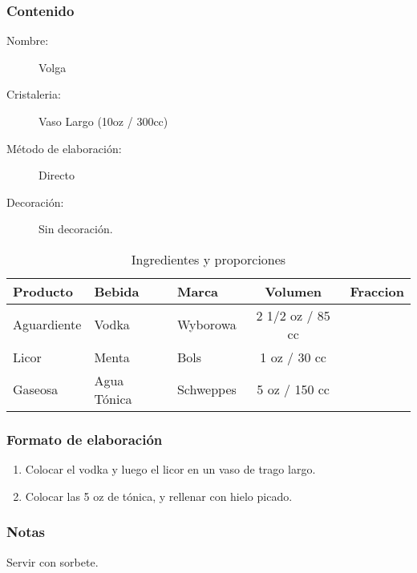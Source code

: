 \bigskip 
\bigskip 
\subsubsection{Contenido}
\bigskip 

\begin{description}
\item[Nombre:] Volga
\item[Cristaleria:] Vaso Largo (10oz / 300cc)
\item[M\'etodo de elaboraci\'on:] Directo
\item[Decoraci\'on:] Sin decoraci\'on.
\end{description}

\begin{table}[h]
\caption{Ingredientes y proporciones} 
\label{tab:fonts}
\begin{center}       
\begin{tabular}{|l|l|l|c|l|} %
\hline
\rule[-1ex]{0pt}{3.5ex}  \textbf{Producto} & \textbf{Bebida} & \textbf{Marca} & \textbf{Volumen} & \textbf{Fraccion}  \\
\hline
\rule[-1ex]{0pt}{3.5ex}  Aguardiente & Vodka 			& Wyborowa 		& 2 1/2 oz / 85 cc 	&  	\\
\hline
\rule[-1ex]{0pt}{3.5ex}  Licor 		& Menta	 	& Bols		& 1 oz / 30 cc 		&  	\\
\hline
\rule[-1ex]{0pt}{3.5ex}  Gaseosa	& Agua T\'onica 	& Schweppes 				& 5 oz / 150 cc		& 	\\
\hline

\end{tabular}
\end{center}
\end{table} 
\bigskip 

\subsubsection{Formato de elaboraci\'on} 
\label{sec:title}
\bigskip 
\begin{center}
\begin{enumerate}
\item Colocar el vodka y luego el licor en un vaso de trago largo.
\item Colocar las 5 oz de t\'onica, y rellenar con hielo picado.
\end{enumerate}
\end{center}
\bigskip 
\bigskip 

\subsubsection{Notas}
\bigskip 
\begin{center}
\raggedright{}Servir con sorbete.
\end{center} 